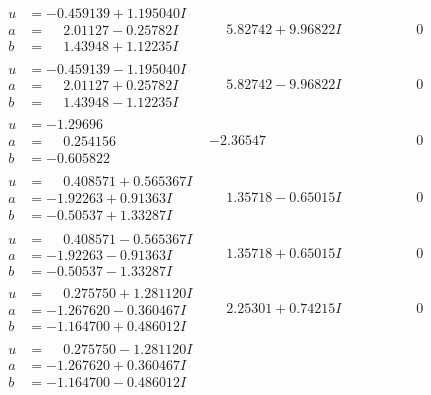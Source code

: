 \documentclass[1p]{elsarticle_modified}
\theoremstyle{definition}
\begin{document}
$$\begin{array}{c|c|c}
\begin{aligned}
u &= -0.459139 + 1.195040 I \\
a &= \phantom{-}2.01127 - 0.25782 I \\
b &= \phantom{-}1.43948 + 1.12235 I\end{aligned}
 & \phantom{-}5.82742 + 9.96822 I & \phantom{-0.000000 } 0 \\ \hline\begin{aligned}
u &= -0.459139 - 1.195040 I \\
a &= \phantom{-}2.01127 + 0.25782 I \\
b &= \phantom{-}1.43948 - 1.12235 I\end{aligned}
 & \phantom{-}5.82742 - 9.96822 I & \phantom{-0.000000 } 0 \\ \hline\begin{aligned}
u &= -1.29696\phantom{ +0.000000I} \\
a &= \phantom{-}0.254156\phantom{ +0.000000I} \\
b &= -0.605822\phantom{ +0.000000I}\end{aligned}
 & -2.36547\phantom{ +0.000000I} & \phantom{-0.000000 } 0 \\ \hline\begin{aligned}
u &= \phantom{-}0.408571 + 0.565367 I \\
a &= -1.92263 + 0.91363 I \\
b &= -0.50537 + 1.33287 I\end{aligned}
 & \phantom{-}1.35718 - 0.65015 I & \phantom{-0.000000 } 0 \\ \hline\begin{aligned}
u &= \phantom{-}0.408571 - 0.565367 I \\
a &= -1.92263 - 0.91363 I \\
b &= -0.50537 - 1.33287 I\end{aligned}
 & \phantom{-}1.35718 + 0.65015 I & \phantom{-0.000000 } 0 \\ \hline\begin{aligned}
u &= \phantom{-}0.275750 + 1.281120 I \\
a &= -1.267620 - 0.360467 I \\
b &= -1.164700 + 0.486012 I\end{aligned}
 & \phantom{-}2.25301 + 0.74215 I & \phantom{-0.000000 } 0 \\ \hline\begin{aligned}
u &= \phantom{-}0.275750 - 1.281120 I \\
a &= -1.267620 + 0.360467 I \\
b &= -1.164700 - 0.486012 I\end{aligned}

\end{array}$$
\end{document}
